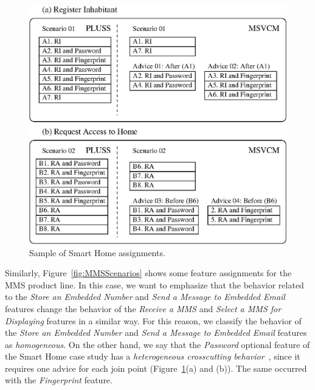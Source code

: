 \begin{figure}[th]
 \begin{center}
  \includegraphics[scale=0.65]{img/comparisonScenarios.eps}
  \caption{Sample of Smart Home assignments.}
  \label{fig:smartHomeScenarios}
  \end{center}
\end{figure}

Similarly, Figure~\ref{fig:MMSScenarios} shows some feature assignments for the
MMS product line. In this case, we want to emphasize that the behavior related to
the \emph{Store an Embedded Number} and \emph{Send a Message to Embedded Email} 
features change the behavior of the \emph{Receive a MMS} and \emph{Select a
MMS for Displaying} features in a similar way. For this reason, we
classify the behavior of the \emph{Store an Embedded Number} and \emph{Send
a Message to Embedded Email} features as \emph{homogeneous}. On the other hand,
we say that the \emph{Password} optional feature of the Smart Home case study has a
\emph{heterogeneous crosscutting behavior}~\cite{Apel:2006aa}, since it requires one advice for each join point (Figure~\ref{fig:smartHomeScenarios}(a) and (b)). The same occurred with the \emph{Fingerprint} feature.

